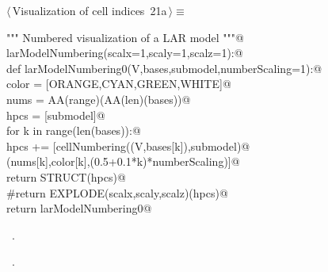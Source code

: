 \documentclass[11pt,oneside]{article}	%
\begin{document}
\begin{flushleft} \small \label{scrap33}
\protect{}$\langle\,$Visualization of cell indices\nobreak\ {\footnotesize 21a}$\,\rangle\equiv$
\vspace{-1ex}
\begin{list}{}{} \item
\mbox{}\verb@""" Numbered visualization of a LAR model """@\\
\mbox{}\verb@def larModelNumbering(scalx=1,scaly=1,scalz=1):@\\
\mbox{}\verb@   def  larModelNumbering0(V,bases,submodel,numberScaling=1):@\\
\mbox{}\verb@      color = [ORANGE,CYAN,GREEN,WHITE]@\\
\mbox{}\verb@      nums = AA(range)(AA(len)(bases))@\\
\mbox{}\verb@      hpcs = [submodel]@\\
\mbox{}\verb@      for k in range(len(bases)):@\\
\mbox{}\verb@         hpcs += [cellNumbering((V,bases[k]),submodel)@\\
\mbox{}\verb@                  (nums[k],color[k],(0.5+0.1*k)*numberScaling)]@\\
\mbox{}\verb@      return STRUCT(hpcs)@\\
\mbox{}\verb@      #return EXPLODE(scalx,scaly,scalz)(hpcs)@\\
\mbox{}\verb@   return larModelNumbering0@\\
\mbox{}\verb@@{\NWsep}
\end{list}
\vspace{-1ex}
\footnotesize\addtolength{\baselineskip}{-1ex}
\begin{list}{}{\setlength{\itemsep}{-\parsep}\setlength{\itemindent}{-\leftmargin}}
\item \NWtxtMacroDefBy\ .
\item \NWtxtMacroRefIn\ .
\end{list}
\end{flushleft}
\end{document}
